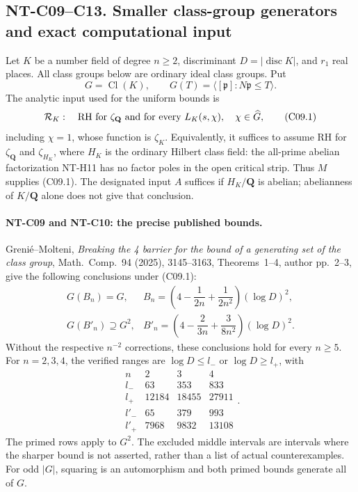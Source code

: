 \subsection*{NT-C09--C13. Smaller class-group generators and exact computational input}

Let \(K\) be a number field of degree \(n\ge2\), discriminant
\(D=|\operatorname{disc}K|\), and \(r_1\) real places. All class
groups below are ordinary ideal class groups. Put
\[
 G=\operatorname{Cl}(K),\qquad
 G(T)=\langle[\mathfrak p]:N\mathfrak p\le T\rangle .
\]
The analytic input used for the uniform bounds is
\[
 {\cal R}_K:\quad
 \text{RH for }\zeta_{\mathbf Q}
 \text{ and for every }L_K(s,\chi),\quad \chi\in\widehat G,
                                                               \tag{C09.1}
\]
including \(\chi=1\), whose function is \(\zeta_K\).
Equivalently, it suffices to assume RH for \(\zeta_{\mathbf Q}\)
and \(\zeta_{H_K}\), where \(H_K\) is the ordinary Hilbert class
field: the all-prime abelian factorization NT-H11 has no
factor poles in the open critical strip. Thus \(M\) supplies
(C09.1). The designated input \(A\) suffices if \(H_K/\mathbf Q\)
is abelian; abelianness of \(K/\mathbf Q\) alone does not give
that conclusion.

\paragraph{NT-C09 and NT-C10: the precise published bounds.}
Greni\'e--Molteni, \emph{Breaking the 4 barrier for the bound of
a generating set of the class group}, Math.\ Comp.\ 94 (2025),
3145--3163, Theorems~1--4, author pp.~2--3, give the following
conclusions under (C09.1):
\[
 \begin{array}{ll}
 G(B_n)=G,&
 B_n=\left(4-\dfrac1{2n}+\dfrac1{2n^2}\right)(\log D)^2,\\[5pt]
 G(B'_n)\supseteq G^2,&
 B'_n=\left(4-\dfrac2{3n}+\dfrac3{8n^2}\right)(\log D)^2 .
 \end{array}                                                    \tag{C09.2}
\]
Without the respective \(n^{-2}\) corrections, these conclusions
hold for every \(n\ge5\). For \(n=2,3,4\), the verified ranges
are \(\log D\le l_-\) or \(\log D\ge l_+\), with
\[
 \begin{array}{c|rrr}
 n&2&3&4\\ \hline
 l_-&63&353&833\\
 l_+&12184&18455&27911\\ \hline
 l'_-&65&379&993\\
 l'_+&7968&9832&13108
 \end{array} .                                                  \tag{C09.3}
\]
The primed rows apply to \(G^2\).
The excluded middle intervals are intervals where the sharper
bound is not asserted, rather than a list of actual counterexamples.
For odd \(|G|\), squaring is an automorphism and both primed
bounds generate all of \(G\).

